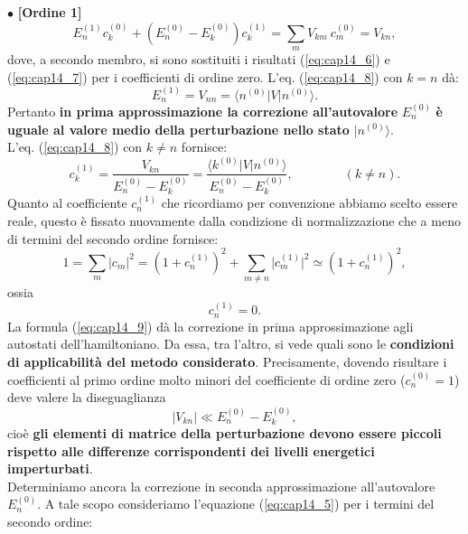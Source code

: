 \documentclass[a4paper,12pt,oneside]{book}
\begin{document}
$\bullet$ \textbf{[Ordine 1]}\\
\begin{equation}
E_n ^{(1)}c_k ^{(0)}+\left(E_n ^{(0)}- E_k ^{(0)}\right)c_k ^{(1)}=\sum _m V_{km}\ c_m ^{(0)} = V_{kn},
\label{eq:cap14_8}
\end{equation}
dove, a secondo membro, si sono sostituiti i risultati (\ref{eq:cap14_6}) e (\ref{eq:cap14_7}) per i coefficienti di ordine zero. L'eq. (\ref{eq:cap14_8}) con $k=n$ dà:
\begin{equation}
E_n  ^{(1)} = V_{nn} = \langle n^{(0)}\vert V \vert n^{(0)} \rangle.
\end{equation}
Pertanto \textbf{in prima approssimazione la correzione all'autovalore} $E_n ^{(0)}$ \textbf{è uguale al valore medio della perturbazione nello stato} $\vert n^{(0)} \rangle$.\\
L'eq. (\ref{eq:cap14_8})  con $k\neq n$ fornisce:
\begin{equation}
c_k ^{(1)} = \frac{V_{kn}}{E_n ^{(0)}-E_k ^{(0)}}=\frac{\langle k^{(0)}\vert V \vert n^{(0)} \rangle}{E_n ^{(0)}-E_k ^{(0)}}, \qquad \qquad (k\neq n).
\label{eq:cap14_9}
\end{equation}
Quanto al coefficiente $c_n ^{(1)}$ che ricordiamo per convenzione abbiamo scelto essere reale, questo è fissato nuovamente dalla condizione di normalizzazione che a meno di termini del secondo ordine fornisce:
\begin{equation}
1= \sum _m \vert c_m \vert ^2 = \left( 1+ c_n ^{(1)}\right) ^2+ \sum _{m\neq n } \vert c_m ^{(1)} \vert ^2 \simeq \left( 1+ c_n ^{(1)}\right) ^2,
\end{equation}
ossia
\begin{equation}
c_n ^{(1)} =0.
\label{eq:cap14_10}
\end{equation}
La formula (\ref{eq:cap14_9}) dà la correzione in prima approssimazione agli autostati dell'hamiltoniano. Da essa, tra l'altro, si vede quali sono le \textbf{condizioni di applicabilità del metodo considerato}. Precisamente, dovendo risultare i coefficienti al primo ordine molto minori del coefficiente di ordine zero ($c_n ^{(0)} =1$) deve valere la diseguaglianza
\begin{equation}
\vert V_{kn} \vert \ll E_ n ^{(0)}-E_ k ^{(0)},
\end{equation}
cioè \textbf{gli elementi di matrice della perturbazione devono essere piccoli rispetto alle differenze corrispondenti dei livelli energetici imperturbati}.\\
Determiniamo ancora la correzione in seconda approssimazione all'autovalore $E_n ^{(0)}$. A tale scopo consideriamo l'equazione (\ref{eq:cap14_5}) per i termini del secondo ordine:\\
\end{document}
